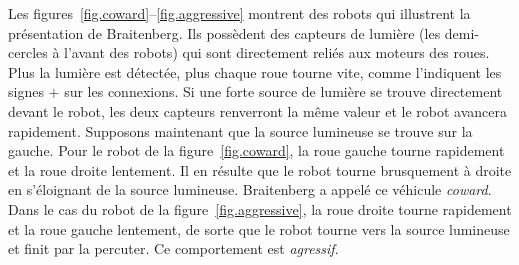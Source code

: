 Les figures~\ref{fig.coward}--\ref{fig.aggressive} montrent des robots qui illustrent la présentation de Braitenberg. Ils possèdent des capteurs de lumière (les demi-cercles à l'avant des robots) qui sont directement reliés aux moteurs des roues. Plus la lumière est détectée, plus chaque roue tourne vite, comme l'indiquent les signes $+$ sur les connexions. Si une forte source de lumière se trouve directement devant le robot, les deux capteurs renverront la même valeur et le robot avancera rapidement. Supposons maintenant que la source lumineuse se trouve sur la gauche. Pour le robot de la
figure~\ref{fig.coward}, la roue gauche tourne rapidement et la roue droite lentement. Il en résulte que le robot tourne brusquement à droite en s'éloignant de la source lumineuse. Braitenberg a appelé ce véhicule \emph{coward}. Dans le cas du robot de la figure~\ref{fig.aggressive}, la roue droite tourne rapidement et la roue gauche lentement, de sorte que le robot tourne vers la source lumineuse et finit par la percuter. Ce comportement est \emph{agressif}.

